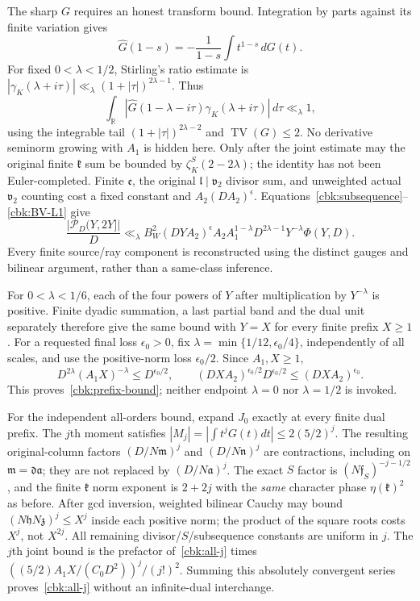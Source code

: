 The sharp $G$ requires an honest transform bound. Integration by
parts against its finite variation gives
\[
 \widehat G(1-s)=-\frac1{1-s}\int t^{1-s}\,dG(t).
\]
For fixed $0<\lambda<1/2$, Stirling's ratio estimate is
$|\gamma_K(\lambda+i\tau)|\ll_\lambda
(1+|\tau|)^{2\lambda-1}$. Thus
\begin{equation}\label{cbk:BV-L1}
 \int_{\mathbb R}|\widehat G(1-\lambda-i\tau)
                          \gamma_K(\lambda+i\tau)|\,d\tau
                         \ll_\lambda1,
\end{equation}
using the integrable tail $(1+|\tau|)^{2\lambda-2}$ and
$\operatorname{TV}(G)\le2$. No derivative seminorm growing with
$A_1$ is hidden here.
Only after the joint estimate may the original finite $\mathfrak k$
sum be bounded by $\zeta_K^S(2-2\lambda)$; the identity has not been
Euler-completed. Finite $\mathfrak e$, the original
$\mathfrak l\mid\mathfrak v_2$ divisor sum, and unweighted actual
$\mathfrak v_2$ counting cost a fixed constant and
$A_2(DA_2)^\epsilon$. Equations~\eqref{cbk:subsequence}--
\eqref{cbk:BV-L1} give
\begin{equation}\label{cbk:fixed-line-band}
 \frac{|\mathcal P_D(Y,2Y]|}{D}
 \ll_{\lambda}B_W^2(DYA_2)^\epsilon
    A_2A_1^{1-\lambda}D^{2\lambda-1}Y^{-\lambda}\Phi(Y,D).
\end{equation}
Every finite source/ray component is reconstructed using the distinct
gauges and bilinear argument, rather than a same-class inference.

For $0<\lambda<1/6$, each of the four powers of $Y$ after
multiplication by $Y^{-\lambda}$ is positive. Finite dyadic summation,
a last partial band and the dual unit separately therefore give
the same bound with $Y=X$ for every finite prefix $X\ge1$.
For a requested final loss $\epsilon_0>0$, fix
$\lambda=\min\{1/12,\epsilon_0/4\}$, independently of all scales,
and use the positive-norm loss $\epsilon_0/2$. Since $A_1,X\ge1$,
\[
 D^{2\lambda}(A_1X)^{-\lambda}\le D^{\epsilon_0/2},\qquad
 (DXA_2)^{\epsilon_0/2}D^{\epsilon_0/2}\le(DXA_2)^{\epsilon_0}.
\]
This proves~\eqref{cbk:prefix-bound}; neither endpoint
$\lambda=0$ nor $\lambda=1/2$ is invoked.

For the independent all-orders bound, expand $J_0$ exactly at every
finite dual prefix. The $j$th moment satisfies
$|M_j|=|\int t^jG(t)dt|\le2(5/2)^j$.
The resulting original-column factors $(D/N\mathfrak m)^j$ and
$(D/N\mathfrak n)^j$ are contractions, including on
$\mathfrak m=\mathfrak d\mathfrak a$; they are not replaced by
$(D/N\mathfrak a)^j$. The exact $S$ factor is
$(N\mathfrak f_S)^{-j-1/2}$, and the finite $\mathfrak k$ norm
exponent is $2+2j$ with the \emph{same} character phase
$\eta(\mathfrak k)^2$ as before. After gcd inversion, weighted
bilinear Cauchy may bound
$(N\mathfrak h N\mathfrak z)^j\le X^j$ inside each positive norm;
the product of the square roots costs $X^j$, not $X^{2j}$.
All remaining divisor/$S$/subsequence constants are uniform in $j$.
The $j$th joint bound is the prefactor of~\eqref{cbk:all-j} times
$((5/2)A_1X/(C_0D^2))^j/(j!)^2$. Summing this absolutely convergent
series proves~\eqref{cbk:all-j} without an infinite-dual interchange.

